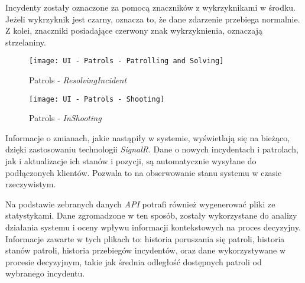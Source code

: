 \par Incydenty zostały oznaczone za pomocą znaczników z wykrzyknikami w środku. Jeżeli wykrzyknik jest czarny, oznacza to, że dane zdarzenie przebiega normalnie. Z kolei, znaczniki posiadające czerwony znak wykrzyknienia, oznaczają strzelaniny.

\begin{figure}
    \centering
    \texttt{[image: UI - Patrols - Patrolling and Solving]}
    \caption{Patrols - \emph{ResolvingIncident}}
    \label{fig:uiPatrolsPatrollingAndSolving}
\end{figure}

\begin{figure}
    \centering
    \texttt{[image: UI - Patrols - Shooting]}
    \caption{Patrols - \emph{InShooting}}
    \label{fig:uiPatrolsInShooting}
\end{figure}

\par Informacje o zmianach, jakie nastąpiły w systemie, wyświetlają się na bieżąco, dzięki zastosowaniu technologii \emph{SignalR}\cite{SIGNALR_SITE}. Dane o nowych incydentach i patrolach, jak i aktualizacje ich stanów i pozycji, są automatycznie wysyłane do podłączonych klientów. Pozwala to na obserwowanie stanu systemu w czasie rzeczywistym.

\par Na podstawie zebranych danych \emph{API} potrafi również wygenerować pliki ze statystykami. Dane zgromadzone w ten sposób, zostały wykorzystane do analizy działania systemu i oceny wpływu informacji kontekstowych na proces decyzyjny. Informacje zawarte w tych plikach to: historia poruszania się patroli, historia stanów patroli, historia przebiegów incydentów, oraz dane wykorzystywane w procesie decyzyjnym, takie jak średnia odległość dostępnych patroli od wybranego incydentu.